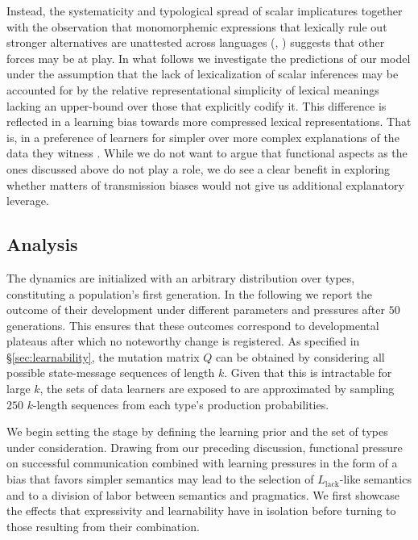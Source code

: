 \documentclass[a4paper]{article}
\newcommand{\mylang}[1]{\ensuremath{L_{\text{#1}}}\xspace} %
\newcommand{\Llack}{\mylang{lack}}
\begin{document}
Instead, the systematicity and typological spread of scalar implicatures together with the observation that monomorphemic expressions that lexically rule out stronger alternatives are unattested across languages (\citealt[252-267]{horn:1984}, \citealt{horn:1972,traugott:2004,vdAuwera:2010}) suggests that other forces may be at play. In what follows we investigate the predictions of our model under the assumption that the lack of lexicalization of scalar inferences may be accounted for by the relative representational simplicity of lexical meanings lacking an upper-bound over those that explicitly codify it. This difference is reflected in a learning bias towards more compressed lexical representations. That is, in a preference of learners for simpler over more complex explanations of the data they witness \citep{feldman:2000, chater+vitanyi:2003, piantadosi+etal:2012a, kirby+etal:2015,piantadosi+etal:underreview}. While we do not want to argue that functional aspects as the ones discussed above do not play a role, we do see a clear benefit in exploring whether matters of transmission biases would not give us additional explanatory leverage.


\subsection{Analysis}
The dynamics are initialized with an arbitrary distribution over types, constituting a population's first generation. In the following we report the outcome of their development under different parameters and pressures after $50$ generations. This ensures that these outcomes correspond to developmental plateaus after which no noteworthy change is registered. As specified in \S\ref{sec:learnability}, the mutation matrix $Q$ can be obtained by considering all possible state-message sequences of length $k$. Given that this is intractable for large $k$, the sets of data learners are exposed to are approximated by sampling $250$ $k$-length sequences from each type's production probabilities. 

We begin setting the stage by defining the learning prior and the set of types under consideration. Drawing from our preceding discussion, functional pressure on successful communication combined with learning pressures in the form of a bias that favors simpler semantics may lead to the selection of $\Llack$-like semantics and to a division of labor between semantics and pragmatics. We first showcase the effects that expressivity and learnability have in isolation before turning to those resulting from their combination. 
\end{document}
